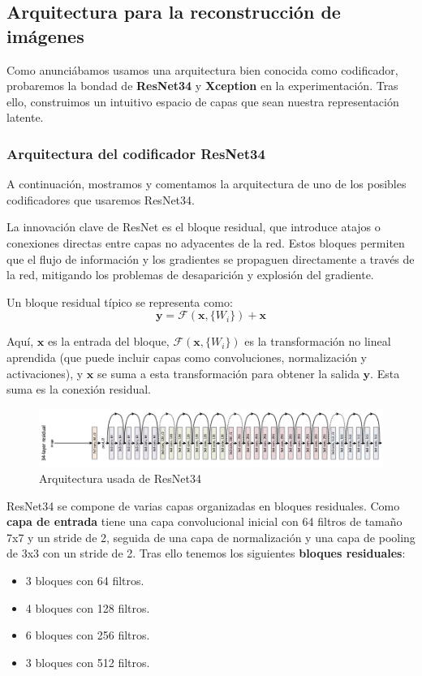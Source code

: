 \subsection{Arquitectura para la reconstrucción de imágenes}

Como anunciábamos usamos una arquitectura bien conocida como codificador, probaremos la bondad de \textbf{ResNet34} y \textbf{Xception} en la experimentación. Tras ello, construimos un intuitivo espacio de capas que sean nuestra representación latente. 

\subsubsection{Arquitectura del codificador ResNet34}

A continuación, mostramos y comentamos la arquitectura de uno de los posibles codificadores que usaremos ResNet34.

La innovación clave de ResNet es el bloque residual, que introduce atajos o conexiones directas entre capas no adyacentes de la red. Estos bloques permiten que el flujo de información y los gradientes se propaguen directamente a través de la red, mitigando los problemas de desaparición y explosión del gradiente.

Un bloque residual típico se representa como:
$$ \mathbf{y} = \mathcal{F}(\mathbf{x}, \{W_i\}) + \mathbf{x} $$

Aquí, \(\mathbf{x}\) es la entrada del bloque, \(\mathcal{F}(\mathbf{x}, \{W_i\})\) es la transformación no lineal aprendida (que puede incluir capas como convoluciones, normalización y activaciones), y \(\mathbf{x}\) se suma a esta transformación para obtener la salida \(\mathbf{y}\). Esta suma es la conexión residual.

\begin{figure}[H]
	\centering
	\includegraphics[width=1.0\linewidth]{imagenes/resnet34_arch.png}
	\caption{Arquitectura usada de ResNet34 \cite{he2016deep}}
\end{figure}

ResNet34 se compone de varias capas organizadas en bloques residuales. Como \textbf{capa de entrada} tiene una capa convolucional inicial con 64 filtros de tamaño 7x7 y un stride de 2, seguida de una capa de normalización y una capa de pooling de 3x3 con un stride de 2. Tras ello tenemos los siguientes \textbf{bloques residuales}:
\begin{itemize}
	\item 3 bloques con 64 filtros.
	\item 4 bloques con 128 filtros.
	\item 6 bloques con 256 filtros.
	\item 3 bloques con 512 filtros.
\end{itemize}


